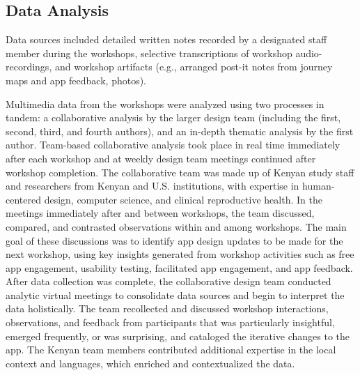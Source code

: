 \subsection{Data Analysis}


Data sources included detailed written notes  recorded by a designated staff member during the workshops, selective transcriptions of workshop audio-recordings, and workshop artifacts (e.g., arranged post-it notes from journey maps and app feedback, photos).  %

Multimedia data from the workshops were analyzed using two processes in tandem: a collaborative analysis by the larger design team (including the first, second, third, and fourth authors), and an in-depth thematic analysis by the first author. Team-based collaborative analysis took place in real time immediately after each workshop and at weekly design team meetings  continued after workshop completion. The collaborative team was made up of Kenyan study staff and researchers from Kenyan and U.S. institutions, with expertise in human-centered design, computer science, and clinical reproductive health. In the meetings immediately after and between workshops, the team discussed, compared, and contrasted observations within and among workshops. The main goal of these discussions was to identify app design updates to be made for the next workshop, using key insights generated from workshop activities such as free app engagement, usability testing, facilitated app engagement, and app feedback. After data collection was complete, the collaborative design team conducted analytic virtual meetings to consolidate data sources and begin to interpret the data holistically. The team recollected and discussed workshop interactions, observations, and feedback from participants that was particularly insightful, emerged frequently, or was surprising, and cataloged the iterative changes to the app. The Kenyan team members contributed additional expertise in the local context and languages, which enriched and contextualized the data.

